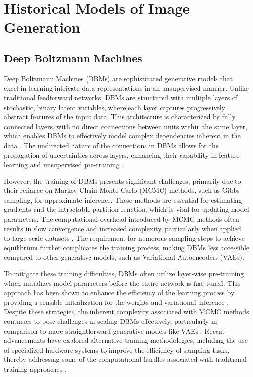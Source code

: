 \chapter{Historical Models of Image Generation}
\label{Related Work}

\section{Deep Boltzmann Machines}

Deep Boltzmann Machines (DBMs) are sophisticated generative models that excel in learning intricate data representations 
in an unsupervised manner. Unlike traditional feedforward networks, DBMs are structured with multiple layers of stochastic, 
binary latent variables, where each layer captures progressively abstract features of the input data. This architecture is 
characterized by fully connected layers, with no direct connections between units within the same layer, which enables DBMs 
to effectively model complex dependencies inherent in the data \citep{10.1007/978-3-642-40728-4_14}. The undirected nature 
of the connections in DBMs allows for the propagation of uncertainties across layers, enhancing their capability in feature 
learning and unsupervised pre-training \citep{10.1007/978-3-642-40728-4_14}\citep{10.48550/arxiv.1203.3783}.

However, the training of DBMs presents significant challenges, primarily due to their reliance on Markov Chain Monte Carlo (MCMC) methods, 
such as Gibbs sampling, for approximate inference. These methods are essential for estimating gradients and the intractable partition 
function, which is vital for updating model parameters. The computational overhead introduced by MCMC methods often results in 
slow convergence and increased complexity, particularly when applied to large-scale datasets \citep{10.48550/arxiv.2303.10728}. 
The requirement for numerous sampling steps to achieve equilibrium further complicates the training process, making DBMs less 
accessible compared to other generative models, such as Variational Autoencoders (VAEs).

To mitigate these training difficulties, DBMs often utilize layer-wise pre-training, which initializes model parameters 
before the entire network is fine-tuned. This approach has been shown to enhance the efficiency of the learning process
by providing a sensible initialization for the weights and variational inference \citep{10.1162/neco_a_00311}. Despite 
these strategies, the inherent complexity associated with MCMC methods continues to pose challenges in scaling DBMs 
effectively, particularly in comparison to more straightforward generative models like VAEs \citep{10.48550/arxiv.2303.10728}. 
Recent advancements have explored alternative training methodologies, including the use of specialized hardware systems to improve 
the efficiency of sampling tasks, thereby addressing some of the computational hurdles associated with traditional training approaches \citep{10.48550/arxiv.2303.10728}.



